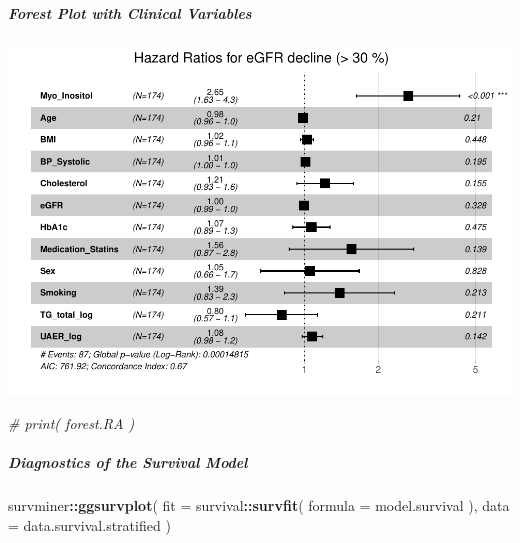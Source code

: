 \documentclass[]{article}
\newenvironment{Shaded}{\begin{snugshade}}{\end{snugshade}}
\newcommand{\CommentTok}[1]{\textcolor[rgb]{0.56,0.35,0.01}{\textit{#1}}}
\newcommand{\DataTypeTok}[1]{\textcolor[rgb]{0.13,0.29,0.53}{#1}}
\newcommand{\KeywordTok}[1]{\textcolor[rgb]{0.13,0.29,0.53}{\textbf{#1}}}
\newcommand{\NormalTok}[1]{#1}
\newcommand{\OperatorTok}[1]{\textcolor[rgb]{0.81,0.36,0.00}{\textbf{#1}}}
\newcommand{\StringTok}[1]{\textcolor[rgb]{0.31,0.60,0.02}{#1}}
\let\oldsubparagraph\subparagraph
\renewcommand{\subparagraph}[1]{\oldsubparagraph{#1}\mbox{}}
\begin{document}
\hypertarget{forest-plot-with-clinical-variables-3}{%
\subparagraph{Forest Plot with Clinical
Variables}\label{forest-plot-with-clinical-variables-3}}

\begin{Shaded}
\end{Shaded}

\includegraphics{0033_PROFIL--Metabolomics_files/figure-latex/Myo-I-Matched-Mortality-Adjusted-Forest-1.pdf}

\begin{Shaded}
\begin{Highlighting}[]
\CommentTok{# print( forest.RA )}
\end{Highlighting}
\end{Shaded}

\newpage

\hypertarget{diagnostics-of-the-survival-model-3}{%
\subparagraph{Diagnostics of the Survival
Model}\label{diagnostics-of-the-survival-model-3}}

\begin{Shaded}
\begin{Highlighting}[]
\NormalTok{survminer}\OperatorTok{::}\KeywordTok{ggsurvplot}\NormalTok{(}
  \DataTypeTok{fit =}\NormalTok{ survival}\OperatorTok{::}\KeywordTok{survfit}\NormalTok{( }\DataTypeTok{formula =}\NormalTok{ model.survival ), }
  \DataTypeTok{data =}\NormalTok{ data.survival.stratified}
\NormalTok{)}
\end{Highlighting}
\end{Shaded}
\end{document}

